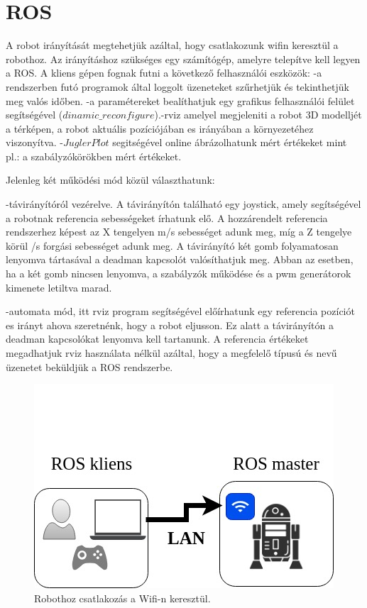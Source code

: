 \section{ROS}

A robot irányítását megtehetjük azáltal, hogy csatlakozunk wifin keresztül a robothoz. Az irányításhoz szükséges egy számítógép, amelyre telepítve kell  legyen a ROS. A kliens gépen fognak futni a következő felhasználói eszközök:
-a rendszerben futó programok által loggolt üzeneteket szűrhetjük és tekinthetjük meg valós időben.
-a paramétereket bealíthatjuk egy grafikus felhasználói felület segítségével ($dinamic\_reconfigure$).-rviz amelyel megjeleniti a robot 3D modelljét a térképen, a robot aktuális pozíciójában es irányában a környezetéhez viszonyítva.
-$JuglerPlot$ segitségével online ábrázolhatunk mért értékeket mint pl.: a szabályzókörökben mért értékeket.

Jelenleg két működési mód közül választhatunk:

	-távirányítóról vezérelve. A távirányítón található egy joystick, amely segítségével a robotnak referencia sebességeket írhatunk elő. A hozzárendelt referencia rendszerhez képest az X tengelyen m/s sebességet adunk meg, míg a Z tengelye körül \degree/s forgási sebességet adunk meg.
A távirányító két gomb folyamatosan lenyomva tártasával a deadman kapcsolót valósíthatjuk meg. Abban az esetben, ha a két gomb nincsen lenyomva, a szabályzók működése és a pwm generátorok kimenete letiltva marad.

	-automata mód, itt rviz program segítségével előírhatunk egy referencia pozíciót es irányt ahova szeretnénk, hogy a robot eljusson. Ez alatt a távirányítón a deadman kapcsolókat lenyomva kell tartanunk. A referencia értékeket megadhatjuk rviz használata nélkül azáltal, hogy a megfelelő típusú és nevű üzenetet beküldjük a ROS rendszerbe.



\begin{figure}[H]
  \includegraphics{tikz/RobotUserLan.jpg}
  \caption{Robothoz csatlakozás a Wifi-n keresztül.}
  \label{fig:RobotUserLan}
\end{figure}


